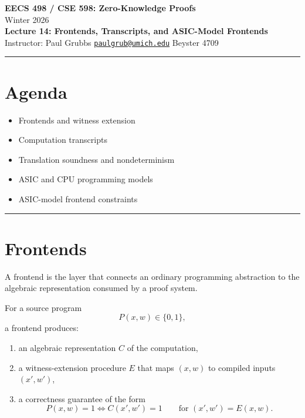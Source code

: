 \documentclass[11pt]{article}
\begin{document}
\begin{center}
  {\LARGE \textbf{EECS 498 / CSE 598: Zero-Knowledge Proofs}}\\[6pt]
  {\large Winter 2026}\\[4pt]
  {\large \textbf{Lecture 14: Frontends, Transcripts, and ASIC-Model Frontends}}\\[4pt]
  {\large Instructor: Paul Grubbs \quad
    \href{mailto:paulgrub@umich.edu}{\texttt{paulgrub@umich.edu}} \quad
    Beyster 4709}
\end{center}

\vspace{0.5em}
\hrule
\vspace{1em}

\section*{Agenda}
\begin{itemize}
  \item Frontends and witness extension
  \item Computation transcripts
  \item Translation soundness and nondeterminism
  \item ASIC and CPU programming models
  \item ASIC-model frontend constraints
\end{itemize}

\hrule
\vspace{1em}

\section{Frontends}

A frontend is the layer that connects an ordinary programming abstraction to
the algebraic representation consumed by a proof system.

\begin{highlight}[title={Frontend Output Triple}]
For a source program
\[
  P(x,w) \in \{0,1\},
\]
a frontend produces:
\begin{enumerate}
  \item an algebraic representation $C$ of the computation,
  \item a witness-extension procedure $E$ that maps $(x,w)$ to compiled inputs
        $(x',w')$,
  \item a correctness guarantee of the form
        \[
          P(x,w)=1
          \iff
          C(x',w')=1
          \qquad\text{for } (x',w') = E(x,w).
        \]
\end{enumerate}
\end{highlight}
\end{document}

